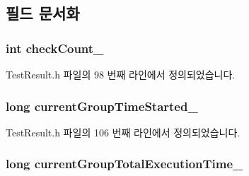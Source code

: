 \subsection{필드 문서화}
\subsubsection[{\texorpdfstring{check\+Count\+\_\+}{checkCount_}}]{\setlength{\rightskip}{0pt plus 5cm}int check\+Count\+\_\+\hspace{0.3cm}{\ttfamily [private]}}\hypertarget{class_test_result_a50ee7523f38c3e4845847d4f155c09f8}{}\label{class_test_result_a50ee7523f38c3e4845847d4f155c09f8}


Test\+Result.\+h 파일의 98 번째 라인에서 정의되었습니다.

\subsubsection[{\texorpdfstring{current\+Group\+Time\+Started\+\_\+}{currentGroupTimeStarted_}}]{\setlength{\rightskip}{0pt plus 5cm}long current\+Group\+Time\+Started\+\_\+\hspace{0.3cm}{\ttfamily [private]}}\hypertarget{class_test_result_aa9b1fed3dedb9610f6703333d8e62ec9}{}\label{class_test_result_aa9b1fed3dedb9610f6703333d8e62ec9}


Test\+Result.\+h 파일의 106 번째 라인에서 정의되었습니다.

\subsubsection[{\texorpdfstring{current\+Group\+Total\+Execution\+Time\+\_\+}{currentGroupTotalExecutionTime_}}]{\setlength{\rightskip}{0pt plus 5cm}long current\+Group\+Total\+Execution\+Time\+\_\+\hspace{0.3cm}{\ttfamily [private]}}\hypertarget{class_test_result_affeb08a81fa11df1befb80894f2609ed}{}\label{class_test_result_affeb08a81fa11df1befb80894f2609ed}


